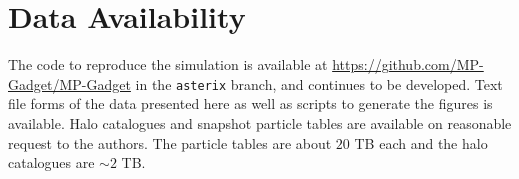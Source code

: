 \documentclass[fleqn,usenatbib]{mnras}
\begin{document}
\section*{Data Availability}

The code to reproduce the simulation is available at \url{https://github.com/MP-Gadget/MP-Gadget} in the \texttt{asterix} branch, and continues to be developed. Text file forms of the data presented here as well as scripts to generate the figures is available. Halo catalogues and snapshot particle tables are available on reasonable request to the authors. The particle tables are about $20$ TB each and the halo catalogues are $\sim 2$ TB.









\bsp	%
\label{lastpage}
\end{document}
